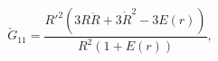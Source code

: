 \begin{equation}
\check{G}_{11}=\frac{R'^2\left(3R\ddot{R}+3\dot{R}^2-3E(r)\right)}{R^2\left(1+E(r)\right)},
\end{equation}

